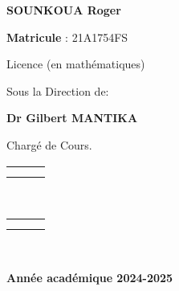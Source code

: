 \documentclass[a4paper, 14pt]{report}
\begin{document}
\begin{center}
{			\begin{center}
				\textbf{SOUNKOUA Roger}
			\end{center}
			
			\begin{center}
				\textbf{Matricule }: 21A1754FS
			\end{center}
			
			\begin{center}
				Licence (en mathématiques)
			\end{center}
			
			\begin{center}
				Sous la Direction de:
			\end{center}
			
			\begin{center}
				\textbf{ Dr Gilbert MANTIKA }
			\end{center}
			\begin{center}
				Chargé de Cours.
			\end{center}
			\begin{center}
				
				\begin{tabularx}{\textwidth}{>{\centering}XcX<{\centering}}
					
					& & \\
					& & \\
					
				\end{tabularx}\\
				
				
				\begin{tabularx}{\textwidth}{>{\centering}XcX<{\centering}}
					
					& & \\
					& & \\
				\end{tabularx}\
				
				\textbf{Année académique 2024-2025}
				
			\end{center} \thispagestyle{empty}
		}
		
		\normalsize
		
		
		
		
	\end{center} \thispagestyle{empty}
	
\end{document}
